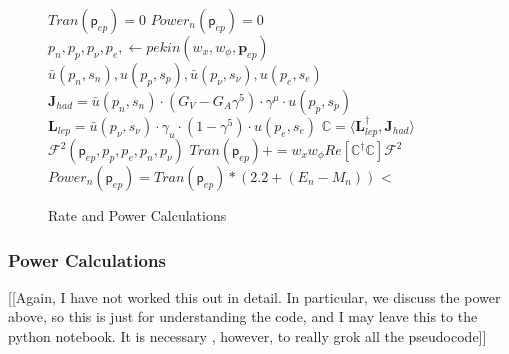 \documentclass[%
 aip,
 jmp,%
 amsmath,amssymb,
 reprint,%
]{revtex4-1}
\begin{document}
 \begin{figure}
 \begin{minipage}{\linewidth}
\begin{algorithm}[H]
\caption{Rate and Power Calculations}\label{code}
\begin{algorithmic}[1]
\State $Tran(\mathsf{p}_{ep})=0$
\State $Power_{n}(\mathsf{p}_{ep})=0$
\State $p_{n},p_{p}, p_{\nu},p_{e}, \gets pekin(w_{x},w_{\phi},\mathbf{p}_{ep})$
\State $\bar{u}(p_{n},s_{n}),u(p_{p},s_{p}), \bar{u}(p_{\nu},s_{\nu}), u(p_{e},s_{e})$
\State $\mathbf{J}_{had}=\bar{u}(p_{n},s_{n})\cdot(G_{V}-G_{A}\gamma^{5})\cdot\gamma^{\mu}\cdot u(p_{p},s_{p})$
\State $\mathbf{L}_{lep}=\bar{u}(p_{\nu},s_{\nu})\cdot\gamma_{u}\cdot(1-\gamma^{5})\cdot u(p_{e},s_{e})$
\EndFor
\State $\mathbb{C}=\langle\mathbf{L}^{\dagger}_{lep},\mathbf{J}_{had}\rangle$
\EndFor
\EndFor
\State $\mathcal{F}^{2}(\mathsf{p}_{ep},p_{p},p_{e}, p_{n}, p_{\nu})$
\State $Tran(\mathsf{p}_{ep})+=w_{x}w_{\phi}Re[\mathbb{C}^{\dagger}\mathbb{C}]\mathcal{F}^{2}$
\EndFor
\State $Power_{n}(\mathsf{p}_{ep})=Tran(\mathsf{p}_{ep})*(2.2+(E_{n}-M_{n}))$
\EndFor<
\end{algorithmic}
\end{algorithm}
\end{minipage}
\end{figure}



\subsubsection{Power Calculations}

[[Again, I have not worked this out in detail.  In particular, we discuss the power above, so this is just for understanding the code, and I may leave this to the python notebook. It is necessary , however, to really grok all the pseudocode]]
\end{document}
